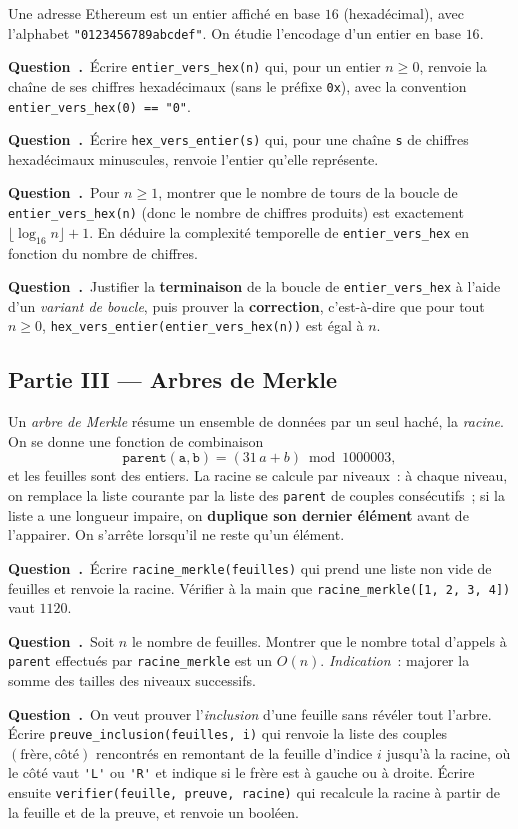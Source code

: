 \documentclass[11pt,a4paper]{article}
\newcounter{qcnt}
\newcommand{\Q}{\medskip\par\stepcounter{qcnt}\noindent\textbf{Question~\theqcnt.}~}
\newcommand{\code}[1]{\lstinline!#1!}
\begin{document}
Une adresse Ethereum est un entier affiché en base $16$ (hexadécimal), avec l'alphabet
\code{"0123456789abcdef"}. On étudie l'encodage d'un entier en base $16$.

\Q Écrire \code{entier_vers_hex(n)} qui, pour un entier $n \ge 0$, renvoie la chaîne de ses
chiffres hexadécimaux (sans le préfixe \code{0x}), avec la convention \code{entier_vers_hex(0) == "0"}.

\Q Écrire \code{hex_vers_entier(s)} qui, pour une chaîne \code{s} de chiffres hexadécimaux
minuscules, renvoie l'entier qu'elle représente.

\Q Pour $n \ge 1$, montrer que le nombre de tours de la boucle de \code{entier_vers_hex(n)}
(donc le nombre de chiffres produits) est exactement $\lfloor \log_{16} n \rfloor + 1$. En déduire
la complexité temporelle de \code{entier_vers_hex} en fonction du nombre de chiffres.

\Q Justifier la \textbf{terminaison} de la boucle de \code{entier_vers_hex} à l'aide d'un
\emph{variant de boucle}, puis prouver la \textbf{correction}, c'est-à-dire que pour tout
$n \ge 0$, \code{hex_vers_entier(entier_vers_hex(n))} est égal à $n$.

\subsection*{Partie III --- Arbres de Merkle}

Un \emph{arbre de Merkle} résume un ensemble de données par un seul haché, la \emph{racine}. On
se donne une fonction de combinaison
$$\mathtt{parent(a, b)} = (31\,a + b) \bmod 1000003,$$
et les feuilles sont des entiers. La racine se calcule par niveaux~: à chaque niveau, on remplace
la liste courante par la liste des \code{parent} de couples consécutifs~; si la liste a une
longueur impaire, on \textbf{duplique son dernier élément} avant de l'appairer. On s'arrête
lorsqu'il ne reste qu'un élément.

\Q Écrire \code{racine_merkle(feuilles)} qui prend une liste non vide de feuilles et renvoie la
racine. Vérifier à la main que \code{racine_merkle([1, 2, 3, 4])} vaut $1120$.

\Q Soit $n$ le nombre de feuilles. Montrer que le nombre total d'appels à \code{parent} effectués
par \code{racine_merkle} est un $O(n)$. \emph{Indication}~: majorer la somme des tailles des
niveaux successifs.

\Q On veut prouver l'\emph{inclusion} d'une feuille sans révéler tout l'arbre. Écrire
\code{preuve_inclusion(feuilles, i)} qui renvoie la liste des couples $(\text{frère}, \text{côté})$
rencontrés en remontant de la feuille d'indice $i$ jusqu'à la racine, où le côté vaut
\code{'L'} ou \code{'R'} et indique si le frère est à gauche ou à droite. Écrire ensuite
\code{verifier(feuille, preuve, racine)} qui recalcule la racine à partir de la feuille et de la
preuve, et renvoie un booléen.
\end{document}
